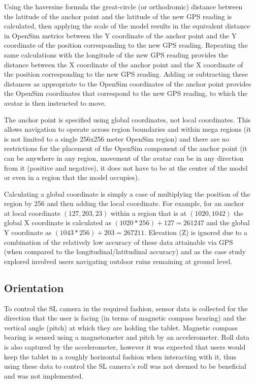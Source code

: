 Using the haversine formula the great-circle (or orthodromic) distance between the latitude of the anchor point and the latitude of the new GPS reading is calculated, then applying the scale of the model results in the equivalent distance in OpenSim metrics between the Y coordinate of the anchor point and the Y coordinate of the position corresponding to the new GPS reading. Repeating the same calculations with the longitude of the new GPS reading provides the distance between the X coordinate of the anchor point and the X coordinate of the position corresponding to the new GPS reading. Adding or subtracting these distances as appropriate to the OpenSim coordinates of the anchor point provides the OpenSim coordinates that correspond to the new GPS reading, to which the avatar is then instructed to move.

The anchor point is specified using global coordinates, not local coordinates. This allows navigation to operate across region boundaries and within mega regions (it is not limited to a single 256x256 meter OpenSim region) and there are no restrictions for the placement of the OpenSim component of the anchor point (it can be anywhere in any region, movement of the avatar can be in any direction from it (positive and negative), it does not have to be at the center of the model or even in a region that the model occupies).

Calculating a global coordinate is simply a case of multiplying the position of the region by 256 and then adding the local coordinate. For example, for an anchor at local coordinate $(127,203,23)$ within a region that is at $(1020,1042)$ the global X coordinate is calculated as $(1020 * 256) + 127 = 261247$ and the global Y coordinate as $(1043 * 256) + 203 = 267211$. Elevation (Z) is ignored due to a combination of the relatively low accuracy of these data attainable via GPS (when compared to the longitudinal/latitudinal accuracy) and as the case study explored involved users navigating outdoor ruins remaining at ground level.

\subsection{Orientation}
To control the SL camera in the required fashion, sensor data is collected for the direction that the user is facing (in terms of magnetic compass bearing) and the vertical angle (pitch) at which they are holding the tablet. Magnetic compass bearing is sensed using a magnetometer and pitch by an accelerometer. Roll data is also captured by the accelerometer, however it was expected that users would keep the tablet in a roughly horizontal fashion when interacting with it, thus using these data to control the SL camera's roll was not deemed to be beneficial and was not implemented.

